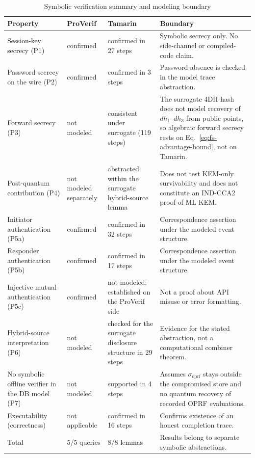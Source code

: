 \documentclass{ieeeijc}
\newcommand{\sigoprf}{\sigma_{\mathrm{oprf}}}
\theoremstyle{remark}
\begin{document}
\begin{table}[t]
\caption{Symbolic verification summary and modeling boundary}
\label{tab:verification-summary}
\centering\scriptsize
\begin{tabularx}{\textwidth}{@{}L{3.4cm}L{2.4cm}L{3.3cm}X@{}}
\toprule
Property & ProVerif & Tamarin & Boundary \\
\midrule
Session-key secrecy (P1) & confirmed & confirmed in 27 steps & Symbolic secrecy only. No side-channel or compiled-code claim. \\
Password secrecy on the wire (P2) & confirmed & confirmed in 3 steps & Password absence is checked in the model trace abstraction. \\
Forward secrecy (P3) & not modeled & consistent under surrogate (119 steps) & The surrogate 4DH hash does not model recovery of $dh_1$--$dh_3$ from public points, so algebraic forward secrecy rests on Eq.~\eqref{eq:fs-advantage-bound}, not on Tamarin. \\
Post-quantum contribution (P4) & not modeled separately & abstracted within the surrogate hybrid-source lemma & Does not test KEM-only survivability and does not constitute an IND-CCA2 proof of ML-KEM. \\
Initiator authentication (P5a) & confirmed & confirmed in 32 steps & Correspondence assertion under the modeled event structure. \\
Responder authentication (P5b) & confirmed & confirmed in 17 steps & Correspondence assertion under the modeled event structure. \\
Injective mutual authentication (P5c) & confirmed & not modeled; established on the ProVerif side & Not a proof about API misuse or error formatting. \\
Hybrid-source interpretation (P6) & not modeled & checked for the surrogate disclosure structure in 29 steps & Evidence for the stated abstraction, not a computational combiner theorem. \\
No symbolic offline verifier in the DB model (P7) & not modeled & supported in 4 steps & Assumes $\sigoprf$ stays outside the compromised store and no quantum recovery of recorded OPRF evaluations. \\
Executability (correctness) & not applicable & confirmed in 16 steps & Confirms existence of an honest completion trace. \\
\midrule
Total & 5/5 queries & 8/8 lemmas & Results belong to separate symbolic abstractions. \\
\bottomrule
\end{tabularx}
\end{table}
\end{document}
